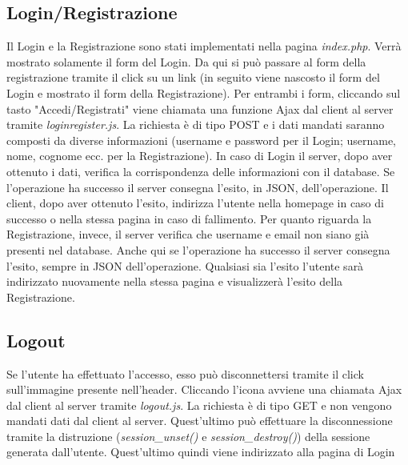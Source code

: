 \documentclass[14pt]{extarticle}
\begin{document}
\subsection{Login/Registrazione}
Il Login e la Registrazione sono stati implementati nella pagina \textit{index.php}. Verrà mostrato
solamente il form del Login. Da qui si può passare al form della registrazione tramite il click su un
link (in seguito viene nascosto il form del Login e mostrato il form della Registrazione).
Per entrambi i form, cliccando sul tasto "Accedi/Registrati" viene chiamata una funzione Ajax
dal client al server tramite \textit{loginregister.js}. La richiesta è di tipo POST e i dati mandati
saranno composti da diverse informazioni (username e password per il Login; username, nome,
cognome ecc. per la Registrazione). In caso di Login il server, dopo aver ottenuto i dati, verifica la
corrispondenza delle informazioni con il database. Se l'operazione ha successo il server
consegna l'esito, in JSON, dell'operazione. Il client, dopo aver ottenuto l'esito, indirizza l'utente
nella homepage in caso di successo o nella stessa pagina in caso di fallimento. Per quanto
riguarda la Registrazione, invece, il server verifica che username e email non siano già presenti nel
database. Anche qui se l'operazione ha successo il server consegna l'esito, sempre in JSON
dell'operazione. Qualsiasi sia l'esito l'utente sarà indirizzato nuovamente nella stessa pagina e
visualizzerà l'esito della Registrazione.

\subsection{Logout}
Se l'utente ha effettuato l'accesso, esso può disconnettersi tramite il click sull'immagine presente
nell'header. Cliccando l'icona avviene una chiamata Ajax dal client al server tramite \textit{logout.js}.
La richiesta è di tipo GET e non vengono mandati dati dal client al server. Quest'ultimo può
effettuare la disconnessione tramite la distruzione (\textit{session\_unset()} e \textit{session\_destroy()}) della
sessione generata dall'utente. Quest'ultimo quindi viene indirizzato alla pagina di Login
\end{document}
